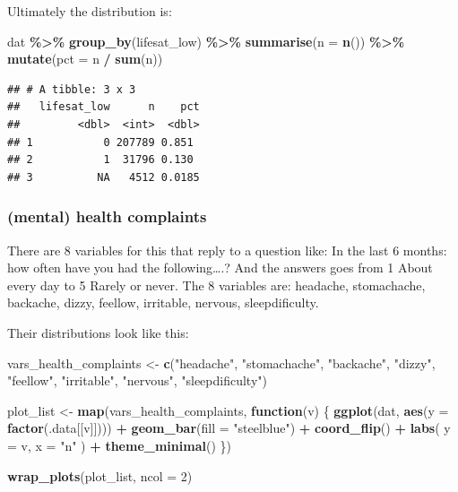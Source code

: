 \documentclass[
]{article}
\newenvironment{Shaded}{\begin{snugshade}}{\end{snugshade}}
\newcommand{\AttributeTok}[1]{\textcolor[rgb]{0.13,0.29,0.53}{#1}}
\newcommand{\ControlFlowTok}[1]{\textcolor[rgb]{0.13,0.29,0.53}{\textbf{#1}}}
\newcommand{\DecValTok}[1]{\textcolor[rgb]{0.00,0.00,0.81}{#1}}
\newcommand{\FunctionTok}[1]{\textcolor[rgb]{0.13,0.29,0.53}{\textbf{#1}}}
\newcommand{\NormalTok}[1]{#1}
\newcommand{\OtherTok}[1]{\textcolor[rgb]{0.56,0.35,0.01}{#1}}
\newcommand{\SpecialCharTok}[1]{\textcolor[rgb]{0.81,0.36,0.00}{\textbf{#1}}}
\newcommand{\StringTok}[1]{\textcolor[rgb]{0.31,0.60,0.02}{#1}}
\begin{document}
Ultimately the distribution is:

\begin{Shaded}
\begin{Highlighting}[]
\NormalTok{dat }\SpecialCharTok{\%\textgreater{}\%}
  \FunctionTok{group\_by}\NormalTok{(lifesat\_low) }\SpecialCharTok{\%\textgreater{}\%}
  \FunctionTok{summarise}\NormalTok{(}\AttributeTok{n =} \FunctionTok{n}\NormalTok{()) }\SpecialCharTok{\%\textgreater{}\%}
  \FunctionTok{mutate}\NormalTok{(}\AttributeTok{pct =}\NormalTok{ n }\SpecialCharTok{/} \FunctionTok{sum}\NormalTok{(n))}
\end{Highlighting}
\end{Shaded}

\begin{verbatim}
## # A tibble: 3 x 3
##   lifesat_low      n    pct
##         <dbl>  <int>  <dbl>
## 1           0 207789 0.851 
## 2           1  31796 0.130 
## 3          NA   4512 0.0185
\end{verbatim}

\subsubsection{(mental) health
complaints}\label{mental-health-complaints}

There are 8 variables for this that reply to a question like: In the
last 6 months: how often have you had the following\ldots.? And the
answers goes from 1 About every day to 5 Rarely or never. The 8
variables are: headache, stomachache, backache, dizzy, feellow,
irritable, nervous, sleepdificulty.

Their distributions look like this:

\begin{Shaded}
\begin{Highlighting}[]
\NormalTok{vars\_health\_complaints }\OtherTok{\textless{}{-}} \FunctionTok{c}\NormalTok{(}\StringTok{"headache"}\NormalTok{, }\StringTok{"stomachache"}\NormalTok{, }\StringTok{"backache"}\NormalTok{, }\StringTok{"dizzy"}\NormalTok{,}
          \StringTok{"feellow"}\NormalTok{, }\StringTok{"irritable"}\NormalTok{, }\StringTok{"nervous"}\NormalTok{, }\StringTok{"sleepdificulty"}\NormalTok{)}

\NormalTok{plot\_list }\OtherTok{\textless{}{-}} \FunctionTok{map}\NormalTok{(vars\_health\_complaints, }\ControlFlowTok{function}\NormalTok{(v) \{}
  \FunctionTok{ggplot}\NormalTok{(dat, }\FunctionTok{aes}\NormalTok{(}\AttributeTok{y =} \FunctionTok{factor}\NormalTok{(.data[[v]]))) }\SpecialCharTok{+}
    \FunctionTok{geom\_bar}\NormalTok{(}\AttributeTok{fill =} \StringTok{"steelblue"}\NormalTok{) }\SpecialCharTok{+}
    \FunctionTok{coord\_flip}\NormalTok{() }\SpecialCharTok{+}
    \FunctionTok{labs}\NormalTok{(}
      \AttributeTok{y =}\NormalTok{ v,}
      \AttributeTok{x =} \StringTok{"n"}
\NormalTok{    ) }\SpecialCharTok{+}
    \FunctionTok{theme\_minimal}\NormalTok{()}
\NormalTok{\})}

\FunctionTok{wrap\_plots}\NormalTok{(plot\_list, }\AttributeTok{ncol =} \DecValTok{2}\NormalTok{)}
\end{Highlighting}
\end{Shaded}
\end{document}
